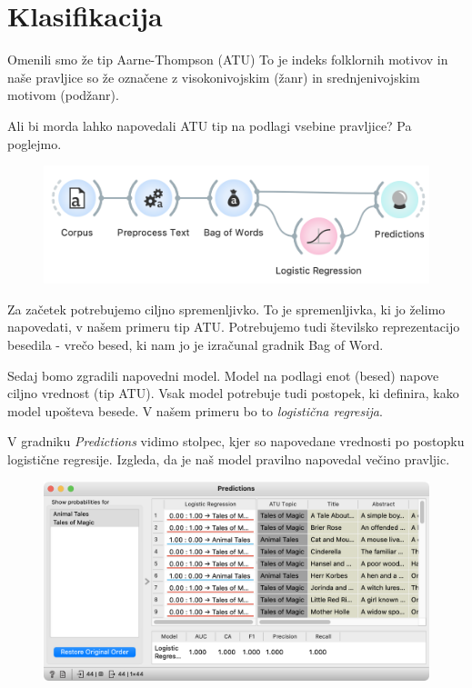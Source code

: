 \chapter{Klasifikacija}
\label{ch:klasifikacija}

Omenili smo že tip Aarne-Thompson (ATU) To je indeks folklornih motivov in naše pravljice so že označene z visokonivojskim (žanr) in srednjenivojskim motivom (podžanr).

Ali bi morda lahko napovedali ATU tip na podlagi vsebine pravljice? Pa poglejmo.

\begin{figure}[h]
    \centering
    \includegraphics[width=0.9\linewidth]{klasifikacija-wf.png}%
    \caption{ }
    \label{fig:002-stop-words}
\end{figure}

Za začetek potrebujemo ciljno spremenljivko. To je spremenljivka, ki jo želimo napovedati, v našem primeru tip ATU. Potrebujemo tudi številsko reprezentacijo besedila - vrečo besed, ki nam jo je izračunal gradnik Bag of Word.

Sedaj bomo zgradili napovedni model. Model na podlagi enot (besed) napove ciljno vrednost (tip ATU). Vsak model potrebuje tudi postopek, ki definira, kako model upošteva besede. V našem primeru bo to \textit{logistična regresija}.

V gradniku \textit{Predictions} vidimo stolpec, kjer so napovedane vrednosti po postopku logistične regresije. Izgleda, da je naš model pravilno napovedal večino pravljic.

\begin{figure}[h]
    \centering
    \includegraphics[width=0.95\linewidth]{predictions.png}%
    \caption{ }
    \label{fig:002-word-cloud}
\end{figure}
